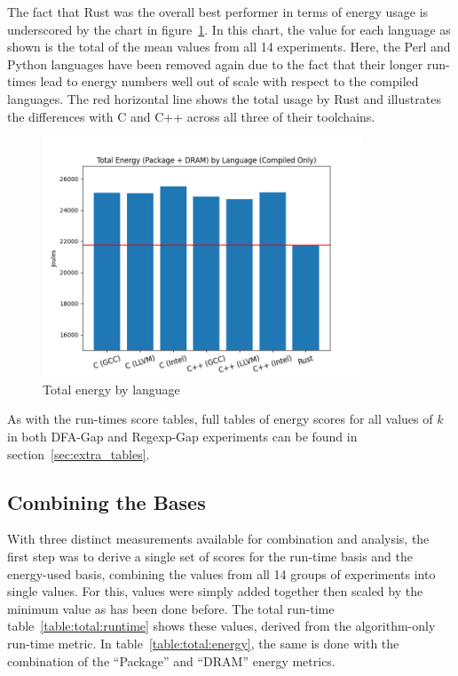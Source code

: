 The fact that Rust was the overall best performer in terms of energy usage is underscored by the chart in figure~\ref{fig:graph:total_power_usage}. In this chart, the value for each language as shown is the total of the mean values from all 14 experiments. Here, the Perl and Python languages have been removed again due to the fact that their longer run-times lead to energy numbers well out of scale with respect to the compiled languages. The red horizontal line shows the total usage by Rust and illustrates the differences with C and C++ across all three of their toolchains.

\begin{figure}[h]
	\centering
    \includegraphics[width=0.85\textwidth]{figures/total_power_usage.png}
    \caption{Total energy by language}
    \label{fig:graph:total_power_usage}
\end{figure}

As with the run-times score tables, full tables of energy scores for all values of $k$ in both DFA-Gap and Regexp-Gap experiments can be found in section~\ref{sec:extra_tables}.

\subsection{Combining the Bases}
\label{subsec:combined}

With three distinct measurements available for combination and analysis, the first step was to derive a single set of scores for the run-time basis and the energy-used basis, combining the values from all 14 groups of experiments into single values. For this, values were simply added together then scaled by the minimum value as has been done before. The total run-time table~\ref{table:total:runtime} shows these values, derived from the algorithm-only run-time metric. In table~\ref{table:total:energy}, the same is done with the combination of the ``Package'' and ``DRAM'' energy metrics.

